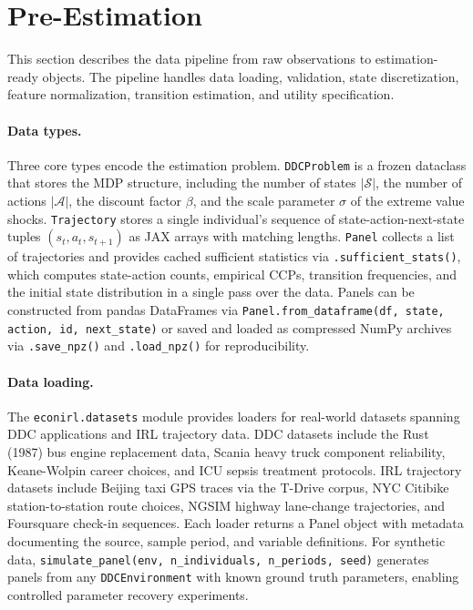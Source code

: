 \section{Pre-Estimation}
\label{sec:pre_estimation}

This section describes the data pipeline from raw observations to estimation-ready objects.
The pipeline handles data loading, validation, state discretization, feature normalization, transition estimation, and utility specification.

\paragraph{Data types.}
Three core types encode the estimation problem.
\texttt{DDCProblem} is a frozen dataclass that stores the MDP structure, including the number of states $|\mathcal{S}|$, the number of actions $|\mathcal{A}|$, the discount factor $\beta$, and the scale parameter $\sigma$ of the extreme value shocks.
\texttt{Trajectory} stores a single individual's sequence of state-action-next-state tuples $(s_t, a_t, s_{t+1})$ as JAX arrays with matching lengths.
\texttt{Panel} collects a list of trajectories and provides cached sufficient statistics via \texttt{.sufficient\_stats()}, which computes state-action counts, empirical CCPs, transition frequencies, and the initial state distribution in a single pass over the data.
Panels can be constructed from pandas DataFrames via \texttt{Panel.from\_dataframe(df, state, action, id, next\_state)} or saved and loaded as compressed NumPy archives via \texttt{.save\_npz()} and \texttt{.load\_npz()} for reproducibility.

\paragraph{Data loading.}
The \texttt{econirl.datasets} module provides loaders for real-world datasets spanning DDC applications and IRL trajectory data.
DDC datasets include the Rust (1987) bus engine replacement data, Scania heavy truck component reliability, Keane-Wolpin career choices, and ICU sepsis treatment protocols.
IRL trajectory datasets include Beijing taxi GPS traces via the T-Drive corpus, NYC Citibike station-to-station route choices, NGSIM highway lane-change trajectories, and Foursquare check-in sequences.
Each loader returns a Panel object with metadata documenting the source, sample period, and variable definitions.
For synthetic data, \texttt{simulate\_panel(env, n\_individuals, n\_periods, seed)} generates panels from any \texttt{DDCEnvironment} with known ground truth parameters, enabling controlled parameter recovery experiments.

